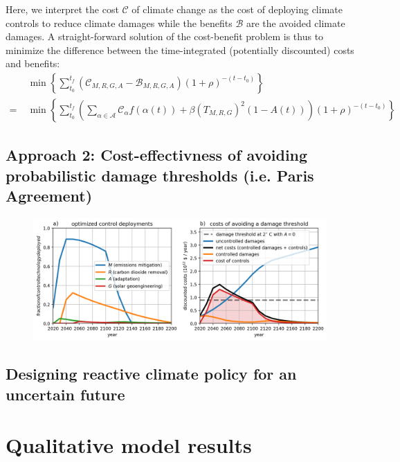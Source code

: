 \documentclass{article}
\begin{document}
Here, we interpret the cost $\mathcal{C}$ of climate change as the cost of deploying climate controls to reduce climate damages while the benefits $\mathcal{B}$ are the avoided climate damages. A straight-forward solution of the cost-benefit problem is thus to minimize the difference between the time-integrated (potentially discounted) costs and benefits:
\begin{align}
    &\min \left\{ \sum_{t_{0}}^{t_{f}} 
    \left(\mathcal{C}_{M, R, G, A} - \mathcal{B}_{M, R, G, A}\right) (1 + \rho)^{-(t-t_{0})} \right\} \\
    = \; & \min \left\{ \sum_{t_{0}}^{t_{f}} \left( \sum_{\alpha \in \mathcal{A}} \mathcal{C}_{\alpha} f(\alpha(t)) + \beta (T_{M, R, G})^{2}(1-A(t)) \right) (1 + \rho)^{-(t-t_{0})} \right\}
\end{align}



\subsection{Approach 2: Cost-effectivness of avoiding probabilistic damage thresholds (i.e. Paris Agreement)}\label{sec.paris_goal}

\begin{figure}[htb!]
\noindent\includegraphics[width=1.0\textwidth]{figures/default-temp_controls_and_damages.png}
\centering
\caption{}
\label{fig.approach2}
\end{figure}

\subsection{Designing reactive climate policy for an uncertain future}

\section{Qualitative model results}
\end{document}
